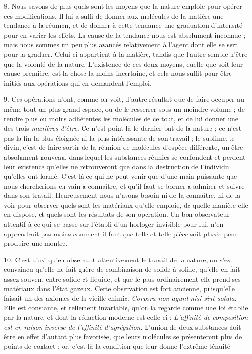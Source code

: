 \documentclass[a4paper, 11pt, oneside, polutonikogreek, french]{article}
\begin{document}
8. Nous savons de plus quels sont les moyens que la nature emploie pour opérer ces modifications. Il lui a suffi de donner aux molécules de la matière une tendance à la réunion, et de donner à cette tendance une graduation d'intensité pour en varier les effets. La cause de la tendance nous est absolument inconnue ; mais nous sommes un peu plus avancés relativement à l'agent dont elle se sert pour la graduer. Celui-ci appartient à la matière, tandis que l'autre semble n'être que la volonté de la nature. L'existence de ces deux moyens, quelle que soit leur cause première, est la chose la moins incertaine, et cela nous suffit pour être initiés aux opérations qui en demandent l'emploi.

9. Ces opérations n'ont, comme on voit, d'autre résultat que de faire occuper au même tout un plus grand espace, ou de le resserrer sous un moindre volume ; de rendre plus ou moins adhérentes les molécules de ce tout, et de lui donner une des trois \emph{manières d'être}. Ce n'est point-là le dernier but de la nature ; ce n'est pas la fin la plus éloignée ni la plus intéressante de son travail ; le sublime, le divin, c'est de faire sortir de la réunion de molécules d'espèce différente, un être absolument nouveau, dans lequel les substances réunies se confondent et perdent leur existence qu'elles ne retrouveront que dans la destruction de l'individu qu'elles ont formé. C'est-là ce qui ne peut venir que d'une main puissante que nous chercherions en vain à connaître, et qu'il faut se borner à admirer et suivre dans son travail. Heureusement nous n'avons besoin ni de la connaître, ni de la voir pour observer quels sont les matériaux qu'elle emploie, de quelle manière elle en dispose, et quels sont les résultats de son opération. Un bon observateur attentif à ce qui se passe sur l'établi d'un horloger invisible pour lui, n'en apprendrait pas moins comment il faut que telle et telle pièce soit placée pour produire une montre.

10. C'est ainsi qu'en observant attentivement le travail de la nature, on s'est convaincu qu'elle ne fait guère de combinaison de solide à solide, qu'elle en fait assez souvent entre solide et liquide, et que le plus ordinairement elle prend ses matériaux dans l'état gazeux. Cette observation est fort ancienne, puisqu'elle faisait un des axiomes de la vieille chimie. \og \emph{Corpora non agunt nisi sint soluta}. Elle est constante, et tellement invariable, qu'on la regarde comme une loi établie par la nature, et dont la rédaction moderne est celle-ci : \og \emph{L'affinité de composition est en raison inverse de l'affinité d'agrégation}. L'union de deux substances doit être en effet d'autant plus favorisée, que leurs molécules se présenteront plus de points de contact ; or, c'est-là la condition que leur donne l'extrême ténuité. \fg \fg
\end{document}

